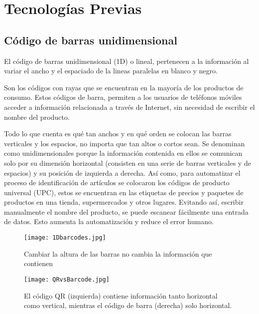 \section{Tecnologías Previas}
\subsection{Código de barras unidimensional}

El código de barras unidimensional (1D) o lineal, pertenecen a la información al variar el ancho y el espaciado de la lineas paralelas en blanco y negro. \cite{2012_Betances}

 
Son los códigos con rayas que se encuentran en la mayoría de los productos de consumo. Estos códigos de barra, permiten a los usuarios de teléfonos móviles acceder a información relacionada a través de Internet, sin necesidad de escribir el nombre del producto.\cite{Reischach2010}

Todo lo que cuenta es qué tan anchos y en qué orden se colocan las barras verticales y los espacios, no importa que tan altos o cortos sean. Se denominan como unidimensionales porque la información contenida en ellos se comunican solo por su dimensión horizontal (consisten en una serie de barras verticales y de espacios) y su posición de izquierda a derecha.
Así como, para automatizar el proceso de identificación de artículos se colocaron los códigos de producto universal (UPC), estos se encuentran en las etiquetas de precios y paquetes de productos en una tienda, supermercados y otros lugares. Evitando así, escribir manualmente el nombre del producto, se puede escanear fácilmente una entrada de datos. Esto aumenta la automatización y reduce el error humano. \cite{2012_DENSO,2012_Varallyai}

\begin{figure} 
\centering
\texttt{[image: 1Dbarcodes.jpg]}
\caption{Cambiar la altura de las barras no cambia la información que contienen}
\label{fig:1dbarcodes}
\end{figure}
\begin{figure} 
\centering
\texttt{[image: QRvsBarcode.jpg]}
\caption{El código QR (izquierda) contiene información tanto horizontal como vertical, mientras el código de barra (derecha) solo horizontal.}
\label{fig:barcode}
\end{figure}

